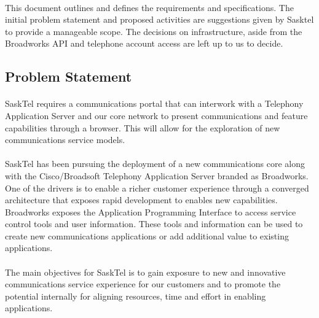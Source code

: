 \documentclass[12pt]{article}
\begin{document}
\paragraph{}
	This document outlines and defines the requirements and specifications. The initial problem statement and proposed activities are suggestions given by Sasktel to provide a manageable scope.
The decisions on infrastructure, aside from the Broadworks API and telephone account access are left up to us to decide. 
\subsection{Problem Statement}
\paragraph{} 
	SaskTel requires a communications portal that can interwork with a Telephony Application Server and our core network to present communications and feature capabilities through a browser.  This will allow for the exploration of new communications service models. 
\paragraph{} 
	SaskTel has been pursuing the deployment of a new communications core along with the Cisco/Broadsoft Telephony Application Server branded as Broadworks.  One of the drivers is to enable a richer customer experience through a converged architecture that exposes rapid development to enables new capabilities.  Broadworks exposes the Application Programming Interface to access service control tools and user information.  These tools and information can be used to create new communications applications or add additional value to existing applications.  
\paragraph{} 
	The main objectives for SaskTel is to gain exposure to new and innovative communications service experience for our customers and to promote the potential internally for aligning resources, time and effort in enabling applications.
\end{document}
